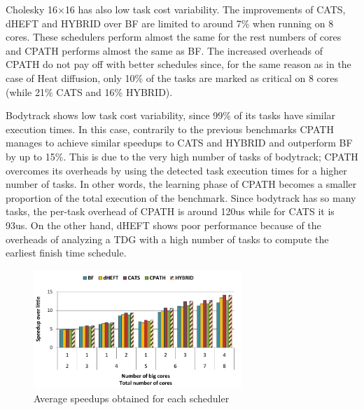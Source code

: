 
Cholesky 16$\times$16 has also low task cost variability. 
The improvements of CATS, dHEFT and HYBRID over BF are limited to around 7\% when running on 8 cores.
These schedulers perform almost the same for the rest numbers of cores and CPATH performs almost the same as BF. 
The increased overheads of CPATH do not pay off with better schedules since, for the same reason as in the case of Heat diffusion, only 10\% of the tasks are marked as critical on 8 cores (while 21\% CATS and 16\% HYBRID).


Bodytrack shows low task cost variability, since 99\% of its tasks have similar execution times.
In this case, contrarily to the previous benchmarks CPATH manages to achieve similar speedups to CATS and HYBRID and outperform BF by up to 15\%.
This is due to the very high number of tasks of bodytrack; CPATH overcomes its overheads by using the detected task execution times for a higher number of tasks.
In other words, the learning phase of CPATH becomes a smaller proportion of the total execution of the benchmark.
Since bodytrack has so many tasks, the per-task overhead of CPATH is around 120us while for CATS it is 93us.
On the other hand, dHEFT shows poor performance because of the overheads of analyzing a TDG with a high number of tasks to compute the earliest finish time schedule.

\begin{figure}[!tr]
	\centering
  	\includegraphics[width=0.7\textwidth]{figures/average_all.pdf}
  	\caption{Average speedups obtained for each scheduler}
  	\label{avg_all}
  	\vspace{-0.5cm}
\end{figure}  


